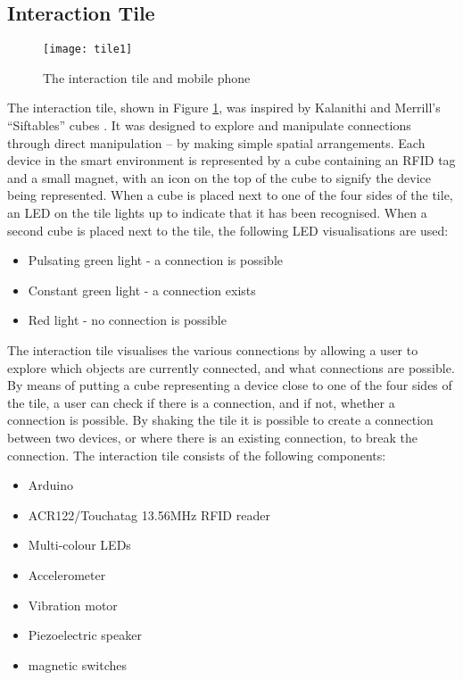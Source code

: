 

\subsection{Interaction Tile}

\begin{figure}[bth]
\centering
\texttt{[image: tile1]}
\caption{The interaction tile and mobile phone}
\label{tile1}
\end{figure}

The interaction tile, shown in Figure \ref{tile1}, was inspired by Kalanithi and Merrill's ``Siftables'' cubes \cite{Merrill2007}. It was designed to explore and manipulate connections through direct manipulation -- by making simple spatial arrangements. Each device in the smart environment is represented by a cube containing an \ac{RFID} tag and a small magnet, with an icon on the top of the cube to signify the device being represented. When a cube is placed next to one of the four sides of the tile, an LED on the tile lights up to indicate that it has been recognised. When a second cube is placed next to the tile, the following LED visualisations are used:

\begin{itemize}
	\item Pulsating green light - a connection is possible
	\item Constant green light - a connection exists
	\item Red light - no connection is possible
\end{itemize}  

The interaction tile visualises the various connections by allowing a user to explore which objects are currently connected, and what connections are possible. By means of putting a cube representing a device close to one of the four sides of the tile, a user can check if there is a connection, and if not, whether a connection is possible. By shaking the tile it is possible to create a connection between two devices, or where there is an existing connection, to break the connection. The interaction tile consists of the following components:

\begin{itemize}
	\item Arduino 
	\item ACR122/Touchatag 13.56MHz \ac{RFID} reader
	\item Multi-colour LEDs
	\item Accelerometer
	\item Vibration motor
	\item Piezoelectric speaker
	\item magnetic switches
\end{itemize}

